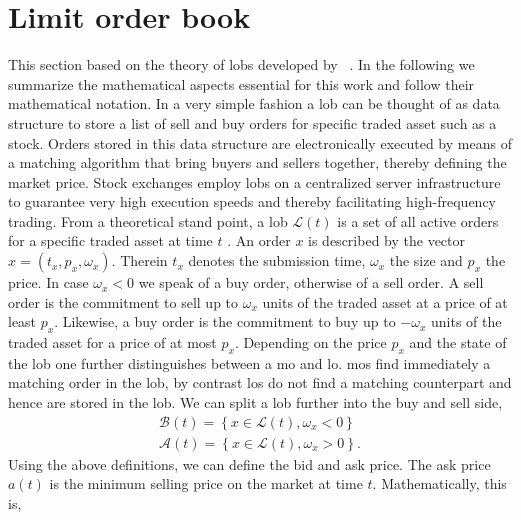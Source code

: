 \documentclass[11pt, a4paper]{thesis}  %
\begin{document}
%
%

\section{Limit order book}
\label{section:lob}


This section based on the theory of \acp{lob} developed by \citeauthor{Gould:2013:LOBs}~\cite{Gould:2013:LOBs}. In the following we summarize the mathematical aspects essential for this work and follow their mathematical notation. In a very simple fashion a \ac{lob} can be thought of as data structure to store a list of sell and buy orders for specific traded asset such as a stock. Orders stored in this data structure are electronically executed by means of a matching algorithm that bring buyers and sellers together, thereby defining the market price. Stock exchanges employ \acp{lob} on a centralized server infrastructure to guarantee very high execution speeds and thereby facilitating high-frequency trading. 
%
From a theoretical stand point, a \ac{lob} $\mathcal{L}(t)$ is a set of all active orders for a specific traded asset at time $t$ \citep{Gould:2013:LOBs}. An order $x$ is described by the vector $x = (t_x, p_x, \omega_x)$. Therein $t_x$ denotes the submission time, $\omega_x$ the size and $p_x$ the price. In case $\omega_x < 0$ we speak of a buy order, otherwise of a sell order. 
A sell order is the commitment to sell up to $\omega_x$ units of the traded asset at a price of at least $p_x$. Likewise, a buy order is the commitment to buy up to $-\omega_x$ units of the traded asset for a price of at most $p_x$. Depending on the price $p_x$ and the state of the \ac{lob} one further distinguishes between a \ac{mo} and \ac{lo}. \acp{mo} find immediately a matching order in the \ac{lob}, by contrast \acp{lo} do not find a matching counterpart and hence are stored in the \ac{lob}. 
%
We can split a \ac{lob} further into the buy and sell side,
%
\begin{eqnarray}
	\mathcal{B}(t)=\left\lbrace x\in\mathcal{L}(t), \omega_x<0 \right\rbrace
	\\
	\mathcal{A}(t)=\left\lbrace x\in\mathcal{L}(t), \omega_x>0 \right\rbrace.
\end{eqnarray}
%
Using the above definitions, we can define the bid and ask price. The ask price $a(t)$ is the minimum selling price on the market at time $t$. Mathematically, this is, 
\end{document}
